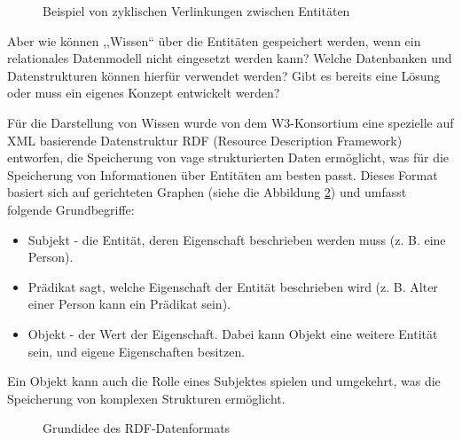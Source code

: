 \begin{figure}[ht]
\vbox{\small}
\caption{Beispiel von zyklischen Verlinkungen zwischen Entitäten}
\label{fig:cyclent}
\end{figure}
Aber wie können ,,Wissen`` über die Entitäten gespeichert werden, wenn ein relationales Datenmodell nicht eingesetzt werden kann? Welche Datenbanken und Datenstrukturen können hierfür verwendet werden? Gibt es bereits eine Lösung oder muss ein eigenes Konzept entwickelt werden?

Für die Darstellung von Wissen wurde von dem W3-Konsortium\cite{klyne2006resource} eine spezielle auf XML basierende Datenstruktur RDF (Resource Description Framework) entworfen, die Speicherung von vage strukturierten Daten ermöglicht, was für die Speicherung von Informationen über Entitäten am besten passt. Dieses Format basiert sich auf gerichteten Graphen (siehe die Abbildung \ref{fig:graph-rdf}) und umfasst folgende Grundbegriffe:
\begin{itemize}
\item Subjekt - die Entität, deren Eigenschaft beschrieben werden muss (z. B. eine Person).
\item Prädikat sagt, welche Eigenschaft der Entität beschrieben wird (z. B. Alter einer Person kann ein Prädikat sein).
\item Objekt - der Wert der Eigenschaft. Dabei kann Objekt eine weitere Entität sein, und eigene Eigenschaften besitzen. 
\end{itemize}
Ein Objekt kann auch die Rolle eines Subjektes spielen und umgekehrt, was die Speicherung von komplexen Strukturen ermöglicht.

\begin{figure}[ht]
\vbox{\small}
\caption{Grundidee des RDF-Datenformats}
\label{fig:graph-rdf}
\end{figure}

